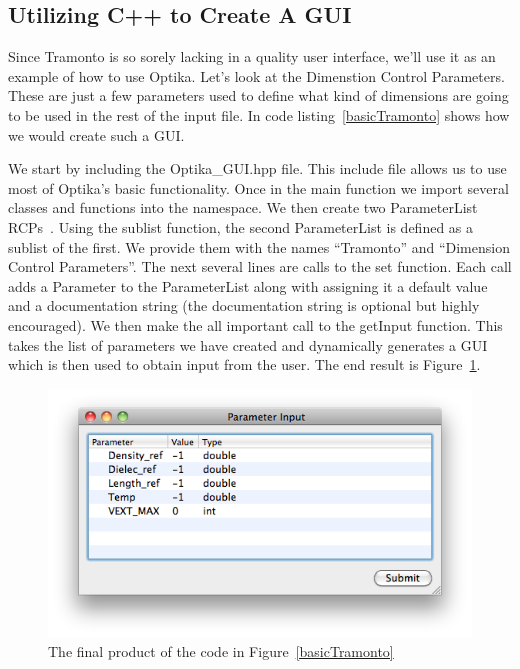 \subsection{Utilizing C++ to Create A GUI}
Since Tramonto is so sorely lacking in a quality user interface, we'll use it as an example of how to use Optika.
Let's look at the Dimenstion Control Parameters. These are just a few parameters used to define what kind of
dimensions are going to be used in the rest of the input file. In code listing~\ref{basicTramonto} shows how we would create
such a GUI.

We start by including the Optika\_GUI.hpp file. This include file allows us to use most of Optika's basic functionality.
Once in the main function we import several classes and functions into the namespace. We then create two
ParameterList RCPs~\cite{RCP}. Using the sublist function, the second 
ParameterList is defined as a sublist of the first. We provide them with the names ``Tramonto'' and
``Dimension Control Parameters''. The next several lines are calls to the set function. Each call
adds a Parameter to the ParameterList along with assigning it a default value and a documentation string (the 
documentation string is optional but highly encouraged). We then make
the all important call to the getInput function. This takes the list of parameters we have created and dynamically
generates a GUI which is then used to obtain input from the user. The end result is Figure~\ref{BasicTramontoScreenshot}.
\begin{figure}
\centering
\includegraphics[scale=0.5]{graphics/BasicTramontoScreenshot}
\caption{The final product of the code in Figure~\ref{basicTramonto}}
\label{BasicTramontoScreenshot}
\end{figure}

